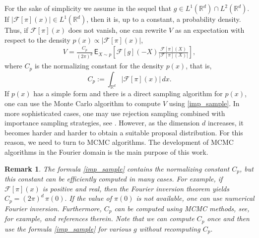 \documentclass[preprint, 3p, authoryear]{elsarticle}
\newtheorem{remark}{Remark}
\theoremstyle{definition}
\begin{document}
For the sake of simplicity we assume in the sequel that  $g\in L^1(\mathbb{R}^d)\cap L^2(\mathbb{R}^d).$
If \(|\mathcal{F}[\pi](x)|\in L^1(\mathbb{R}^d)\), then it is, up to a constant, a probability density. Thus, if $\mathcal{F}[\pi](x)$ does not vanish, one can rewrite $V$ as an expectation with respect to the density \(p(x)\propto |\mathcal{F}[\pi](x)|\),
\begin{eqnarray}
\label{imp_sample}
V=\frac{C_{p}}{(2\pi)^d} \,\mathsf{E}_{X\sim p}\left[\mathcal{F}[g](-X)\frac{\mathcal{F}[\pi](X)}{|\mathcal{F}[\pi](X)|}\right],
\end{eqnarray}
where $C_{p}$ is the normalizing constant for the density $p(x)$, that is,
\[
C_{p}:=\int_{\mathbb{R}^d} |\mathcal{F}[\pi](x)|\,dx.
\]
If $p(x)$ has a simple form and there is a direct sampling algorithm for $p(x)$, 
one can use the Monte Carlo algorithm to compute $V$ using \eqref{imp_sample}.
In more sophisticated cases,  one may use rejection sampling combined with importance sampling 
strategies, see \cite{BCGMR}. However, as the dimension $d$ increases, 
it becomes harder and harder to obtain a suitable proposal distribution.
For this reason, we need to turn to  MCMC algorithms.
The development of MCMC algorithms in the Fourier domain is the main purpose of this work.

\begin{remark}
	 The formula \eqref{imp_sample} contains the normalizing constant $C_{p}$, but
	this constant can be efficiently computed in many cases. For example, if 
	$\mathcal{F}[\pi](x)$ is positive and real, 
	then the Fourier inversion theorem yields $C_{p}= (2\pi)^d \, \pi(0).$  If the value of $\pi(0)$ is not available,
	 one can use numerical Fourier inversion.
	Furthermore, $C_{p}$ can be computed using MCMC methods, see, for example, \cite{brosse2018normalizing} and references therein. 
	Note that we can compute $C_{p}$ once and then use the formula \eqref{imp_sample} for various \(g\) without recomputing \(C_{p}.\)
\end{remark} 
\end{document}
